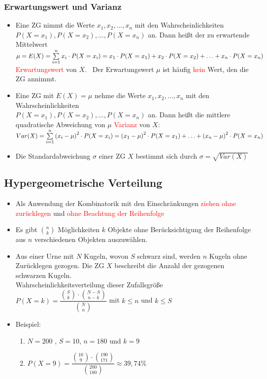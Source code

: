 \documentclass[a4paper,twocolumn,10pt]{onepgnote1}
\renewcommand\mynote{\notebox{Hinweis:}\ }
\begin{document}
\subsubsection{Erwartungswert und Varianz}
\begin{itemize}
    \item Eine ZG nimmt die Werte $x_1, x_2,\ldots , x_n$ mit den Wahrscheinlichkeiten $P(X=x_1), P(X=x_2), \ldots, P(X=x_n)$ an. Dann heißt der zu erwartende Mittelwert\\ $ \mu =E(X) = \sum\limits_{i=1}^n x_i\cdot P(X=x_i) \\= x_1\cdot P(X=x_1) + x_2\cdot P(X=x_2) +\ldots + x_n \cdot P(X=x_n)$ \textcolor{red}{Erwartungswert} von $X$. \mynote Der Erwartungswert $\mu$ ist häufig \textcolor{red}{kein} Wert, den die ZG annimmt.
    \item Eine ZG mit $E(X) = \mu$ nehme die Werte $x_1, x_2,\ldots , x_n$ mit den Wahrscheinlichkeiten\\ $P(X=x_1), P(X=x_2), \ldots, P(X=x_n)$ an. Dann heißt die mittlere quadratische Abweichung von $\mu$ \textcolor{red}{Varianz} von $X$: \\ $Var(X) = \sum\limits_{i=1}^n \left(x_i - \mu\right)^2 \cdot P(X = x_i)\\ = \left(x_1 - \mu\right)^2 \cdot P(X = x_1) + \ldots + \left(x_n - \mu\right)^2 \cdot P(X = x_n)$
    \item Die Standardabweichung $\sigma$ einer ZG $X$ bestimmt sich durch $\sigma = \sqrt{Var(X)}$
\end{itemize}

\subsection{Hypergeometrische Verteilung}
\begin{itemize}
    \item Als Anwendung der Kombinatorik mit den Einschränkungen \textcolor{red}{ziehen ohne zurücklegen} und \textcolor{red}{ohne Beachtung der Reihenfolge}
    \item Es gibt $\binom{n}{k}$ Möglichkeiten $k$ Objekte ohne Berücksichtigung der Reihenfolge aus $n$ verschiedenen Objekten auszuwählen.
    \item Aus einer Urne mit $N$ Kugeln, wovon $S$ schwarz sind, werden $n$ Kugeln ohne Zurücklegen gezogen. Die ZG $X$ beschreibt die Anzahl der gezogenen schwarzen Kugeln.\\
Wahrscheinlichkeitsverteilung dieser Zufallsgröße \\$P(X = k) = \dfrac{\binom{S}{k}\cdot \binom{N-S}{n-k}}{\binom{N}{n}}$ mit $k\leq n$ und $k\leq S$
\item Beispiel: 
\begin{enumerate}
\item $N=200$ , $S = 10$, $n=180$ und $k=9$\\
    \item $P(X=9)= \dfrac {\binom{10}{9} \cdot \binom {190}{171}}{\binom{200}{180}} \approx 39,74\%$
\end{enumerate}
\end{itemize}
\end{document}
